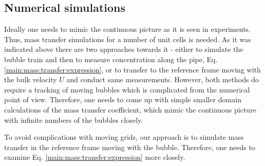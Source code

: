 \documentclass{article}
\begin{document}
\subsection{Numerical simulations}
\label{section:cases}
Ideally one needs to mimic the continuous picture as it is seen in experiments. Thus, mass transfer simulations for a number of unit cells is needed. As it was indicated above there are
two approaches towards it - either to simulate
the bubble train and then to measure concentration along the pipe, Eq.
\ref{main:mass:transfer:expression}, or to transfer to the reference frame moving with the bulk
velocity $U$ and conduct same measurements. However, both methods do require a tracking of
moving bubbles which is complicated from the numerical point of view. Therefore, one needs to come
up with simple smaller domain calculations of the mass transfer coefficient, which mimic the
continuous picture with infinite numbers of the bubbles closely. 

To avoid complications with moving grids, our
approach is to simulate mass transfer in the reference frame moving with the bubble. Therefore, one
needs to examine  Eq.
\ref{main:mass:transfer:expression} more closely. 
\end{document}
